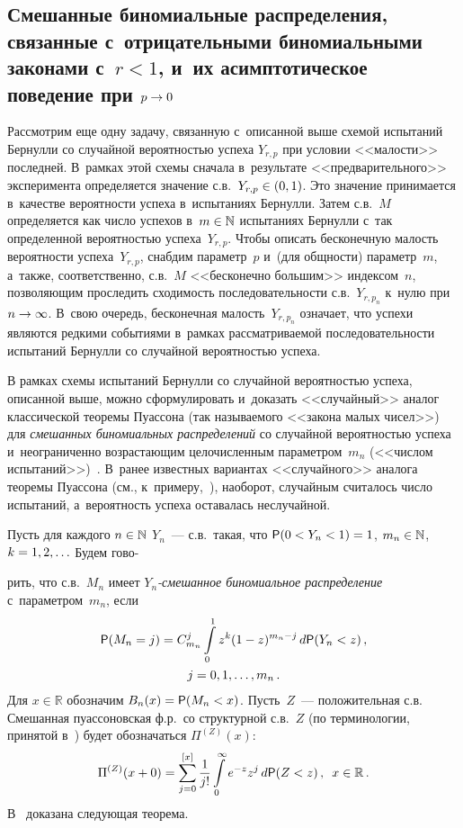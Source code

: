 \begin{multicols}{2}
\section{Смешанные биномиальные распределения, связанные с~отрицательными
биномиальными законами с~$r<1$, и~их асимп\-то\-ти\-чес\-кое
поведение при $p\hm\to0$}

Рассмотрим еще одну задачу, связанную с~описанной выше схемой
испытаний Бернулли со случай\-ной вероятностью успеха $Y_{r,p}$ при
условии <<малости>> последней. В~рамках этой схемы сначала 
в~результате <<предварительного>> эксперимента определяется значение
с.в.~$Y_{r,p}\hm\in(0,1)$. Это значение принимается в~качестве
вероятности успеха в~испытаниях Бернулли. Затем с.в.~$M$ 
определяется как число успехов в~$m\hm\in\mathbb{N}$ испытаниях
Бернулли с~так определенной вероятностью успеха~$Y_{r,p}$. Чтобы
описать бесконечную малость вероятности успеха~$Y_{r,p}$, снабдим
параметр~$p$ и~(для общности) параметр~$m$, а~также, соответственно,
с.в.~$M$ <<бесконечно большим>> индексом~$n$, позволяющим
проследить сходимость последовательности с.в.~$Y_{r,p_n}$ к~нулю
при $n\hm\to\infty$. В~свою очередь, бесконечная малость~$Y_{r,p_n}$
означает, что успехи являются редкими событиями в~рамках
рассматриваемой последовательности испытаний Бернулли со случайной
вероятностью успеха.

В рамках схемы испытаний Бернулли со случайной вероятностью успеха,
описанной выше, можно сформулировать и~доказать <<случайный>> аналог
классической тео\-ре\-мы Пуассона (так называемого <<закона малых
чисел>>) для {\it смешанных биномиальных распределений} со случайной
вероятностью успеха и~неограниченно возрастающим целочисленным
параметром~$m_n$ (<<числом испытаний>>)~\cite{KorolevPoisson,
Korolev2016}. В~ранее известных вариантах <<случайного>> аналога
тео\-ре\-мы Пуассона (см., к~примеру,~\cite{KorolevBeningShorgin2011}),
наоборот, случайным считалось число испытаний, а~вероятность успеха
оставалась неслучайной.

Пусть для каждого $n\hm\in\mathbb{N}$ $Y_n$~--- с.в.\ такая, что ${\sf
P}(0\hm<Y_n\hm<1)\hm=1$, $m_n\hm\in\mathbb{N}$, $k\hm=1,2,\ldots$ Будем гово-\linebreak\vspace*{-12pt}

\pagebreak

\noindent
рить, что
с.в.~$M_n$ имеет {\it $Y_n$-сме\-шан\-ное биномиальное распределение} 
с~параметром~$m_n$, если
\begin{multline}
 {\sf P}(M_n=j)=C_{m_n}^j\int\limits_{0}^{1}z^k(1-z)^{m_n-j}\,d{\sf P}(Y_n<z)\,,\\
j=0,1,\ldots , m_n\,.
\label{e12-kor}
\end{multline}
Для $x\in\mathbb{R}$ обозначим $B_n(x)\hm={\sf P}(M_n<x)$. Пусть~$Z$~---
положительная с.в. Смешанная пуассоновская ф.р.\ со структурной с.в.~$Z$ 
(по терминологии, принятой в~\cite{Grandell1997}) будет
обозначаться $\Pi^{(Z)}(x)$:
$$
\Pi^{(Z)}(x+0)=\sum\limits_{j=0}^{[x]}\displaystyle\frac{\displaystyle 1\mathstrut}{\displaystyle j!\mathstrut}\int\limits_{0}^{\infty}e^{-z}z^j\,
d{\sf P}(Z<z)\,,\enskip x\in\mathbb{R}\,.
$$
В~\cite{Korolev2016} доказана следующая теорема.


\end{multicols}
